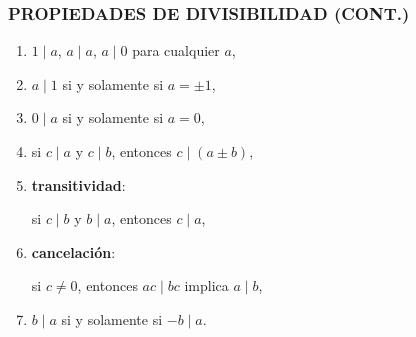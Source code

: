 \begin{frame}
  \frametitle{PROPIEDADES DE DIVISIBILIDAD (CONT.)}

  \begin{enumerate}
  \item<2->[1)] $1\mid a$, $a \mid a$, $a \mid 0$ para cualquier $a$,

  \item<3->[2)] $a\mid 1$ si y solamente si $a = \pm 1$,

  \item<4->[3)] $0\mid a$ si y solamente si $a = 0$,

  \item<5->[4)] si $c \mid a$ y $c \mid b$, entonces $c \mid (a \pm b)$,

  \item<6->[5)] \textbf{transitividad}:

    si $c \mid b$ y $b \mid a$, entonces $c \mid a$,

  \item<7->[6)] \textbf{cancelación}:

    si $c \ne 0$, entonces
    $ac \mid bc$ implica $a\mid b$,

  \item<8->[7)] $b \mid a$ si y solamente si $-b \mid a$.
  \end{enumerate}

\end{frame}


